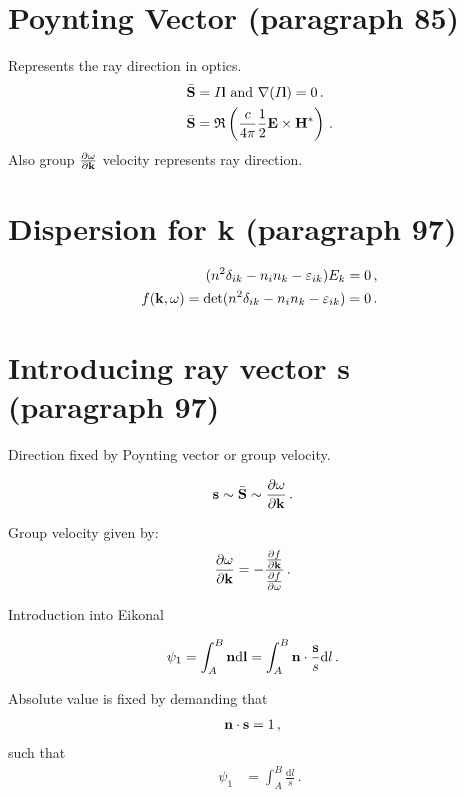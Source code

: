 \documentclass[a4paper,12pt]{article}
\newcommand{\vct}[1]{{\bf #1}}
\begin{document}
\section{Poynting Vector (paragraph 85)}
Represents the ray direction in optics.
\begin{align}
 \bar{\vct{S}} &= I \vct{l}\text{ and }\vct{\nabla}(I \vct{l}) = 0\,.\\
 \bar{\vct{S}} &= \mathfrak{R} 
 \left(
 \frac{c}{4\pi} \frac{1}{2} 
 \vct{E} \times \vct{H}^\ast
 \right)\,.
\end{align}
Also group $\tfrac{\partial \omega}{\partial \vct{k}}$ 
velocity represents ray direction.

\section{Dispersion for k (paragraph 97)}

\begin{align}
 (n^2 \delta_{ik} - n_i n_k - \varepsilon_{ik}) E_k &= 0\,,\\
 f(\vct{k}, \omega) = \det(n^2 \delta_{ik} - n_i n_k - \varepsilon_{ik}) &= 0\,.
\end{align}

\section{Introducing ray vector s (paragraph 97)}

Direction fixed by Poynting vector or group velocity.

\begin{align}
 \vct{s} &\sim \bar{\vct{S}} \sim \frac{\partial \omega}{\partial \vct{k}}\,.
\end{align}

Group velocity given by:
\begin{align}
 \frac{\partial \omega}{\partial \vct{k}} &= - 
 \frac{\frac{\partial f}{\partial \vct{k}}}
 {\frac{\partial f}{\partial \omega}}\,.
\end{align}


Introduction into Eikonal

\begin{align}
 \psi_1 &= \int_A^B \vct{n} \text{d}\vct{l}
 = \int_A^B \vct{n}\cdot\frac{\vct{s}}{s} \text{d}l\,.
\end{align}

Absolute value is fixed by demanding that
\begin{align}
 \vct{n}\cdot\vct{s} &= 1\,,
\end{align}
such that
\begin{align}
 \psi_1 &= \int_A^B \frac{\text{d}l}{s}\,.
\end{align}
\end{document}
